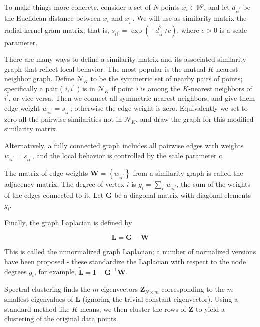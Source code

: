 \documentclass[10pt]{article}
\begin{document}
To make things more concrete, consider a set of $N$ points $x_{i} \in \mathbb{R}^{p}$, and let $d_{i i^{\prime}}$ be the Euclidean distance between $x_{i}$ and $x_{i^{\prime}}$. We will use as similarity matrix the radial-kernel gram matrix; that is, $s_{i i^{\prime}}=\exp \left(-d_{i i^{\prime}}^{2} / c\right)$, where $c>0$ is a scale parameter.

There are many ways to define a similarity matrix and its associated similarity graph that reflect local behavior. The most popular is the mutual $K$-nearest-neighbor graph. Define $\mathcal{N}_{K}$ to be the symmetric set of nearby pairs of points; specifically a pair ( $i, i^{\prime}$ ) is in $\mathcal{N}_{K}$ if point $i$ is among the $K$-nearest neighbors of $i^{\prime}$, or vice-versa. Then we connect all symmetric nearest neighbors, and give them edge weight $w_{i i^{\prime}}=s_{i i^{\prime}}$; otherwise the edge weight is zero. Equivalently we set to zero all the pairwise similarities not in $\mathcal{N}_{K}$, and draw the graph for this modified similarity matrix.

Alternatively, a fully connected graph includes all pairwise edges with weights $w_{i i^{\prime}}=s_{i i^{\prime}}$, and the local behavior is controlled by the scale parameter $c$.

The matrix of edge weights $\mathbf{W}=\left\{w_{i i^{\prime}}\right\}$ from a similarity graph is called the adjacency matrix. The degree of vertex $i$ is $g_{i}=\sum_{i^{\prime}} w_{i i^{\prime}}$, the sum of the weights of the edges connected to it. Let $\mathbf{G}$ be a diagonal matrix with diagonal elements $g_{i}$.

Finally, the graph Laplacian is defined by


\begin{equation*}
\mathbf{L}=\mathbf{G}-\mathbf{W} \tag{14.63}
\end{equation*}


This is called the unnormalized graph Laplacian; a number of normalized versions have been proposed - these standardize the Laplacian with respect to the node degrees $g_{i}$, for example, $\tilde{\mathbf{L}}=\mathbf{I}-\mathbf{G}^{-1} \mathbf{W}$.

Spectral clustering finds the $m$ eigenvectors $\mathbf{Z}_{N \times m}$ corresponding to the $m$ smallest eigenvalues of $\mathbf{L}$ (ignoring the trivial constant eigenvector). Using a standard method like $K$-means, we then cluster the rows of $\mathbf{Z}$ to yield a clustering of the original data points.
\end{document}
